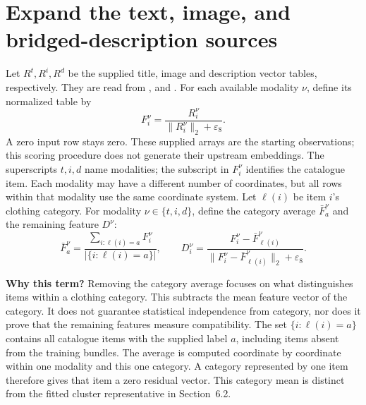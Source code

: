 \documentclass[11pt,a4paper]{article}
\newcommand{\why}{\par\textbf{Why this term?} }
\numberwithin{equation}{section}
\begin{document}
\section{Expand the text, image, and bridged-description sources}
Let $R^t,R^i,R^d$ be the supplied title, image and description vector tables,
respectively. They are read from ,
 and . For each available
modality $\nu$, define its normalized table by
\begin{equation}
 F_i^\nu=\frac{R_i^\nu}{\lVert R_i^\nu\rVert_2+\varepsilon_8}.
\end{equation}
A zero input row stays zero. These supplied arrays are the starting observations;
this scoring procedure does not generate their upstream embeddings. The superscripts $t,i,d$ name modalities; the
subscript in $F_i^\nu$ identifies the catalogue item. Each modality may have a
different number of coordinates, but all rows within that modality use the same
coordinate system. Let $\ell(i)$ be item $i$'s clothing category. For modality
$\nu\in\{t,i,d\}$, define the category average $\bar F^\nu_a$ and the remaining feature $D^\nu$:
\begin{equation}
 \bar F^\nu_a=\frac{\sum_{i:\ell(i)=a}F^\nu_i}{|\{i:\ell(i)=a\}|},\qquad
 D^\nu_i=\frac{F^\nu_i-\bar F^\nu_{\ell(i)}}
 {\lVert F^\nu_i-\bar F^\nu_{\ell(i)}\rVert_2+\varepsilon_8}.
\end{equation}
\why Removing the category average focuses on what distinguishes items within a clothing
category. This subtracts the mean feature vector of the category. It does not guarantee statistical independence from category, nor does it prove that the remaining features measure compatibility.
The set $\{i:\ell(i)=a\}$ contains all catalogue items with the supplied label
$a$, including items absent from the training bundles. The average is computed
coordinate by coordinate within one modality and this one category. A category
represented by one item therefore gives that item a zero residual vector. This
category mean is distinct from the fitted cluster representative in Section~6.2.
\end{document}
